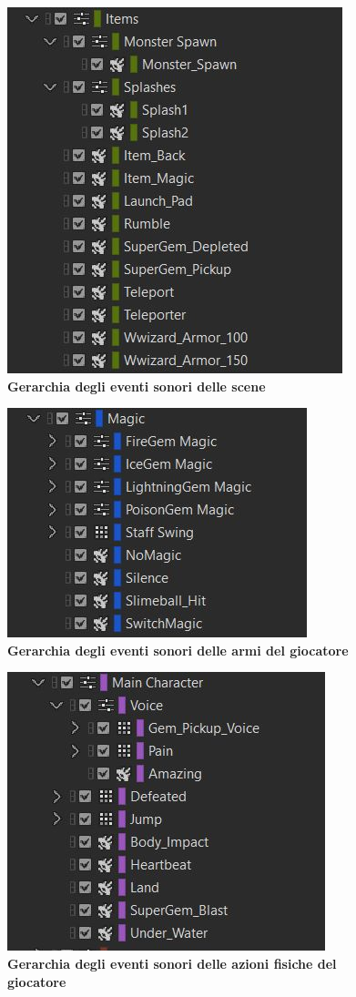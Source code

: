 	\begin{figure}[h]
		\begin{center}
			\includegraphics[width=.47\textwidth]{img/image3.jpg}
			\caption{\textbf{Gerarchia degli eventi sonori delle scene}}
			\label{gr01}
		\end{center}
	\end{figure}
	
	\begin{figure}[h]
		\begin{center}
			\includegraphics[width=.47\textwidth]{img/image4.jpg}
			\caption{\textbf{Gerarchia degli eventi sonori delle armi del giocatore}}
			\label{gr01}
		\end{center}
	\end{figure}
		
	\begin{figure}[h]
		\begin{center}
			\includegraphics[width=.47\textwidth]{img/image5.jpg}
			\caption{\textbf{Gerarchia degli eventi sonori delle azioni fisiche del giocatore}}
			\label{gr01}
		\end{center}
	\end{figure}
	
